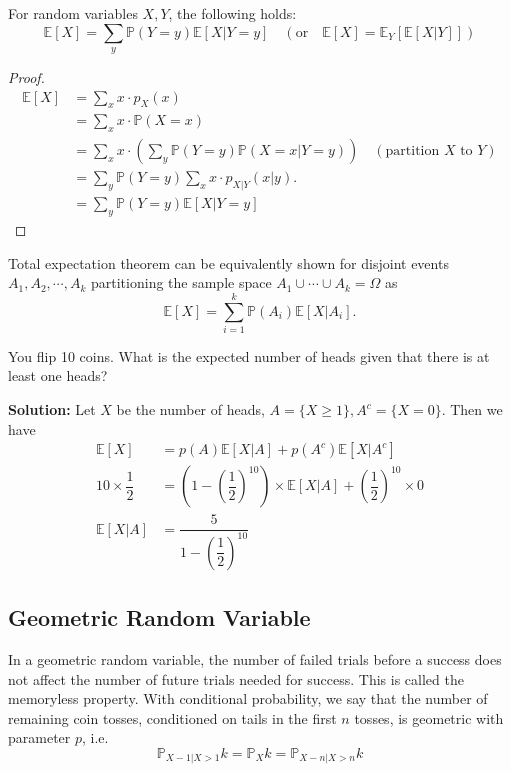 \begin{theorem}
    For random variables \(X, Y\), the following holds:
    \[
        \mathbb{E}[X] = \sum_{y} \mathbb{P}(Y = y)\mathbb{E}[X \vert Y = y]\quad\left(\text{or}\quad \mathbb{E}[X] = \mathbb{E}_{Y}\left[ \mathbb{E}[X \vert Y]\right]\right)
    \]
    \begin{proof}
        \[
            \begin{aligned}
            \mathbb{E}[X] &= \sum_{x} x \cdot p_X (x) \\
            &= \sum_{x} x \cdot \mathbb{P}(X = x) \\
            &= \sum_{x} x \cdot \left(\sum_{y} \mathbb{P}(Y = y)\mathbb{P}(X = x \vert Y = y)\right) \quad(\text{partition \(X\) to  \(Y\)}) \\
            &= \sum_{y} \mathbb{P}(Y = y) \sum_{x} x \cdot p_{X \vert Y} (x \vert y). \\
            &= \sum_{y} \mathbb{P}(Y = y)\mathbb{E}[X \vert Y = y]
        \end{aligned}
        \]
    \end{proof}
\end{theorem}

Total expectation theorem can be equivalently shown for disjoint events \(A_1, A_2, \cdots, A_k\) partitioning the sample space \(A_1 \cup \cdots \cup A_k = \Omega\) as 
\[
    \mathbb{E}[X] = \sum_{i = 1}^k \mathbb{P}(A_i)\mathbb{E}[X \vert A_i]. 
\] 

\begin{eg}
    You flip 10 coins. What is the expected number of heads given
    that there is at least one heads?

    \textbf{Solution:} 
    Let \(X\) be the number of heads, \(A = \{X \geq 1\}, A^c = \{X = 0\}\). Then we have 
    \[
    \begin{aligned}
        \mathbb{E}[X] &= p(A)\mathbb{E}[X \vert A] + p(A^c)\mathbb{E}[X \vert A^c] \\
        10 \times \dfrac{1}{2} &= \left(1 - (\dfrac{1}{2})^{10}\right) \times \mathbb{E}[X \vert A] + (\dfrac{1}{2})^{10} \times 0\\
        \mathbb{E}[X \vert A] &= \dfrac{5}{1 - (\dfrac{1}{2})^{10}}
    \end{aligned}
    \]
\end{eg}

\subsection{Geometric Random Variable}
In a geometric random variable, the number of failed trials before a success does not affect the number of future trials needed for success. This is called the memoryless property. With conditional probability, we say that the number of remaining coin tosses, conditioned on tails in the first \(n\) tosses, is geometric with parameter \(p\), i.e.
\[
    \mathbb{P}_{X-1 \vert X > 1} k = \mathbb{P}_X k = \mathbb{P}_{X-n \vert X>n} k
\]

